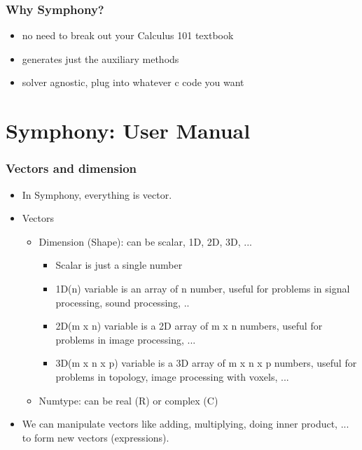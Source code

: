 \documentclass[presentation]{beamer}
\begin{document}
\begin{frame}[fragile]
  \frametitle{Why Symphony?}
  \begin{itemize}
  \item no need to break out your Calculus 101 textbook
  \item generates just the auxiliary methods
  \item solver agnostic, plug into whatever c code you want
  \end{itemize}
\end{frame}


\section{Symphony: User Manual}

\begin{frame}
  \frametitle{Vectors and dimension}
  \begin{itemize}
    \item In Symphony, everything is vector.
    \item Vectors
      \begin{itemize}
    \item Dimension (Shape): can be scalar, 1D, 2D, 3D, ...
      \begin{itemize}
      \item Scalar is just a single number 
      \item 1D(n) variable is an array of n number, useful for problems in signal processing, sound processing, ..
      \item 2D(m x n) variable is a 2D array of m x n numbers, useful for problems in image processing, ...
      \item 3D(m x n x p) variable is a 3D array of m x n x p numbers, useful for
        problems in topology, image processing with voxels, ...
      \end{itemize}
    \item Numtype: can be real (R) or complex (C)
      \end{itemize}
    \item We can manipulate vectors like adding, multiplying, doing inner product, ... to form new vectors (expressions).
  \end{itemize}
\end{frame}
\end{document}
